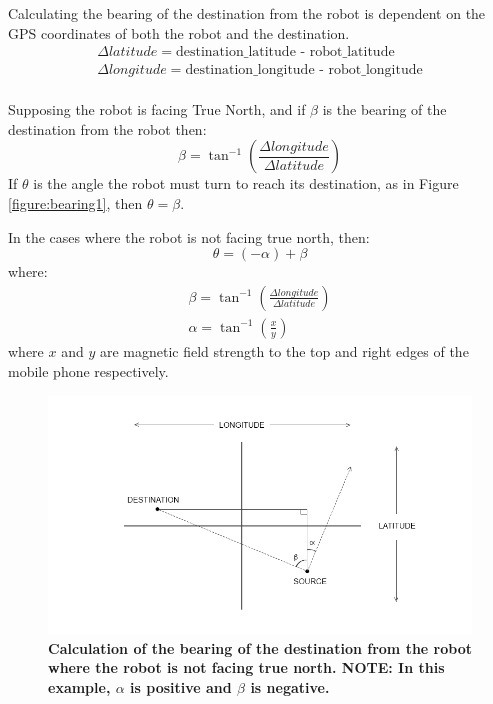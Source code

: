 \documentclass[titlepage,12pt,a4paper]{article}
\begin{document}
Calculating the bearing of the destination from the robot is dependent on the GPS coordinates of both the robot and the destination.
\begin{equation}
	\begin{split}
		\Delta{latitude} = \text{destination\_latitude - robot\_latitude}\\
		\Delta{longitude} = \text{destination\_longitude - robot\_longitude}\\
	\end{split}
\end{equation}

Supposing the robot is facing True North, and if $\beta$ is the bearing of the destination from the robot then:
\begin{equation}
	\beta = \tan^{-1}({\frac{\Delta{longitude}}{\Delta{latitude}}})
\end{equation}
If $\theta$ is the angle the robot must turn to reach its destination, as in Figure \ref{figure:bearing1}, then $\theta = \beta$.

In the cases where the robot is not facing true north, then:
\begin{equation}
	\theta =	(-\alpha) + \beta
	\label{equation:desired_heading}
\end{equation}
where:
\begin{equation}
\begin{split}
	\beta =	\tan^{-1}({\frac{\Delta{longitude}}{\Delta{latitude}}})\\
	\alpha = \tan^{-1}(\frac{x}{y})
\end{split}
\end{equation}
where $x$ and $y$ are magnetic field strength to the top and right edges of the mobile phone respectively.

\begin{figure}[h]
	\centering
	\includegraphics[scale=0.6]{figures/bearingsOffset.png}
	\caption{\textbf{Calculation of the bearing of the destination from the robot where the robot is not facing true north. NOTE: In this example, $\alpha$ is positive and $\beta$ is negative.}}
\end{figure}
\end{document}
